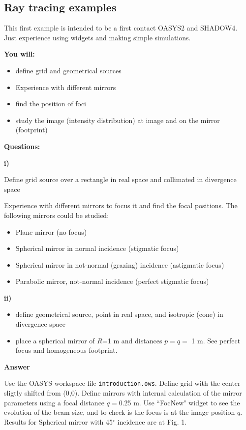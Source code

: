 \subsection{Ray tracing examples}

This first example is intended to be a first contact OASYS2 and SHADOW4. Just experience using widgets and making simple simulations. 

\textbf{You will:}

\begin{itemize}
    \item define grid and geometrical sources
    \item Experience with different mirrors
    \item find the position of foci
    \item study the image (intensity distribution) at image and on the mirror (footprint)
\end{itemize}

\textbf{Questions:}

\textbf{i)}  

Define grid source over a rectangle in real space and collimated in divergence space

Experience with different mirrors to focus it and find the focal positions. The following mirrors could be studied: 

\begin{itemize}
    \item Plane mirror (no focus)
    \item Spherical mirror in normal incidence (stigmatic focus)
    \item Spherical mirror in not-normal (grazing) incidence (astigmatic focus)
    \item Parabolic mirror, not-normal incidence (perfect stigmatic focus)
\end{itemize}

\textbf{ii)}  

\begin{itemize}
    \item define geometrical source, point in real space, and isotropic (cone) in divergence space
    \item place a spherical mirror of $R$=1 m and distances $p=q=$ 1 m. See perfect focus and homogeneous footprint.
\end{itemize}


\textbf{Answer}

Use the OASYS workspace file {\tt introduction.ows}. Define grid with the center sligtly shifted from (0,0). Define mirrors with internal calculation of the mirror parameters using a focal distance $q=$0.25 m. Use ``FocNew" widget to see the evolution of the beam size, and to check is the focus is at the image position $q$. Results for Spherical mirror with 45$^\circ$ incidence are at Fig. 1. 

